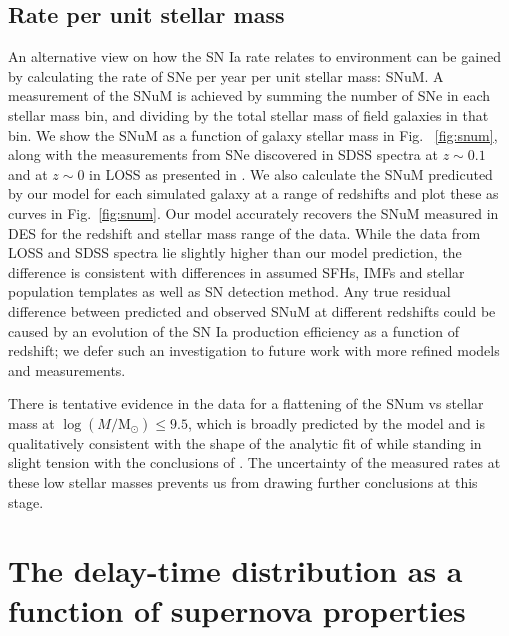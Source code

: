 \documentclass[fleqn,usenatbib]{mnras}
\begin{document}
\subsection{Rate per unit stellar mass \label{subsec:snum}}

An alternative view on how the SN Ia rate relates to environment can be gained by calculating the rate of SNe per year per unit stellar mass: SNuM. A measurement of the SNuM is achieved by summing the number of SNe in each stellar mass bin, and dividing by the total stellar mass of field galaxies in that bin. We show the SNuM as a function of galaxy stellar mass in Fig.~ \ref{fig:snum}, along with the measurements from SNe discovered in SDSS spectra \citep{Graur2013} at $z\sim0.1$ and at $z\sim0$ in LOSS as presented in \citet{Li2011a}. We also calculate the SNuM predicuted by our model for each simulated galaxy at a range of redshifts and plot these as curves in Fig.~\ref{fig:snum}. Our model accurately recovers the SNuM measured in DES for the redshift and stellar mass range of the data. While the data from LOSS and SDSS spectra lie slightly higher than our model prediction, the difference is consistent with differences in assumed SFHs, IMFs and stellar population templates as well as SN detection method. Any true residual difference between predicted and observed SNuM at different redshifts could be caused by an evolution of the SN Ia production efficiency as a function of redshift; we defer such an investigation to future work with more refined models and measurements.

There is tentative evidence in the data for a flattening of the SNum vs stellar mass at $\log(M/\mathrm{M}_{\odot})\leq9.5$, which is broadly predicted by the model and is qualitatively consistent with the shape of the analytic fit of \citet{Kistler2013} while standing in slight tension with the conclusions of \citet{Brown2019}. The uncertainty of the measured rates at these low stellar masses prevents us from drawing further conclusions at this stage.
\section{The delay-time distribution as a function of supernova properties}
\label{sec:split_x1_c}
\end{document}
